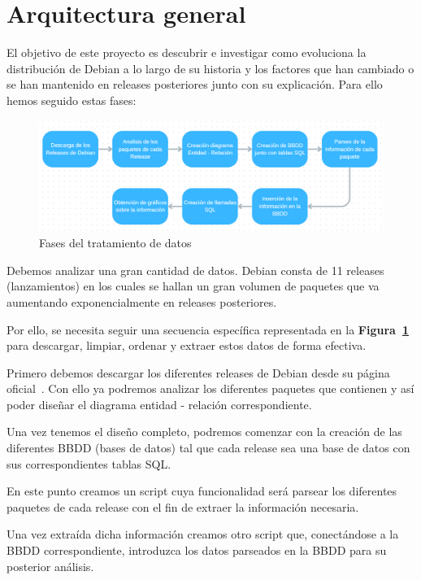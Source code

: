 \documentclass[a4paper, 12pt]{book}
\begin{document}
\section{Arquitectura general} 
\label{sec:arquitectura}
El objetivo de este proyecto es descubrir e investigar como evoluciona la distribución de Debian a lo largo de su historia y los factores que han cambiado o se han mantenido en releases posteriores junto con su explicación. Para ello hemos seguido estas fases:
\begin{figure}[h]
	\centering
	\includegraphics[width=14cm, keepaspectratio]{img/Diagrama_general.png}
	\caption{Fases del tratamiento de datos}
	\label{fig:Diagrama_general}
\end{figure}

Debemos analizar una gran cantidad de datos. Debian consta de 11 releases (lanzamientos) en los cuales se hallan un gran volumen de paquetes que va aumentando exponencialmente en releases posteriores.

Por ello, se necesita seguir una secuencia específica representada en la \textbf {Figura~\ref{fig:Diagrama_general}} para descargar, limpiar, ordenar y extraer estos datos de forma efectiva. 

Primero debemos descargar los diferentes releases de Debian desde su página oficial~\cite{debian:_releases}.
Con ello ya podremos analizar los diferentes paquetes que contienen y así poder diseñar el diagrama entidad - relación correspondiente.

Una vez tenemos el diseño completo, podremos comenzar con la creación de las diferentes BBDD (bases de datos) tal que cada release sea una base de datos con sus correspondientes tablas SQL.

En este punto creamos un script cuya funcionalidad será parsear los diferentes paquetes de cada release con el fin de extraer la información necesaria.

Una vez extraída dicha información creamos otro script que, conectándose a la BBDD correspondiente, introduzca los datos parseados en la BBDD para su posterior análisis.
\end{document}

